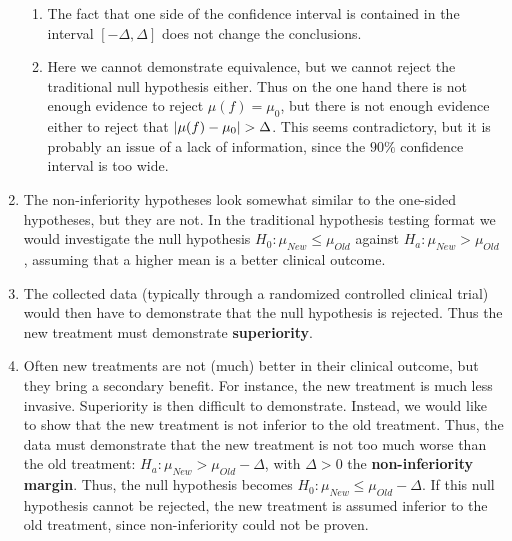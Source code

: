 \begin{enumerate}
\begin{enumerate}
        \item The fact that one side of the confidence interval is contained in the interval $[-\Delta, \Delta]$ does not change the conclusions.
        \hfill \cite{statistics/book/Statistics-for-Data-Scientists/Maurits-Kaptein}

        \item Here we cannot demonstrate equivalence, but we cannot reject the traditional null hypothesis either. 
        Thus on the one hand there is not enough evidence to reject $\mu( f ) = \mu_0 $, but there is not enough evidence either to reject that $\left| \mu( f ) - \mu_0 \right| > \Delta$.
        This seems contradictory, but it is probably an issue of a lack of information, since the $90\%$ confidence interval is too wide.
        \hfill \cite{statistics/book/Statistics-for-Data-Scientists/Maurits-Kaptein}
    \end{enumerate}

    \item The non-inferiority hypotheses look somewhat similar to the one-sided hypotheses, but they are not.
    In the traditional hypothesis testing format we would investigate the null hypothesis $H_0 : \mu_{N ew} \leq \mu_{Old}$ against $H_a : \mu_{N ew} > \mu_{Old}$ , assuming that a higher mean is a better clinical outcome.
    \hfill \cite{statistics/book/Statistics-for-Data-Scientists/Maurits-Kaptein}

    \item The collected data (typically through a randomized controlled clinical trial) would then have to demonstrate that the null hypothesis is rejected. 
    Thus the new treatment must demonstrate \textbf{superiority}. 
    \hfill \cite{statistics/book/Statistics-for-Data-Scientists/Maurits-Kaptein}

    \item Often new treatments are not (much) better in their clinical outcome, but they bring a secondary benefit. 
    For instance, the new treatment is much less invasive. 
    Superiority is then difficult to demonstrate. 
    Instead, we would like to show that the new treatment is not inferior to the old treatment. 
    Thus, the data must demonstrate that the new treatment is not too much worse than the old treatment: $H_a : \mu_{N ew} > \mu_{Old} - \Delta$, with $\Delta > 0$ the \textbf{non-inferiority margin}. 
    Thus, the null hypothesis becomes $H_0 : \mu_{N ew} \leq \mu_{Old} - \Delta$. 
    If this null hypothesis cannot be rejected, the new treatment is assumed inferior to the old treatment, since non-inferiority could not be proven.
    \hfill \cite{statistics/book/Statistics-for-Data-Scientists/Maurits-Kaptein}
\end{enumerate}





